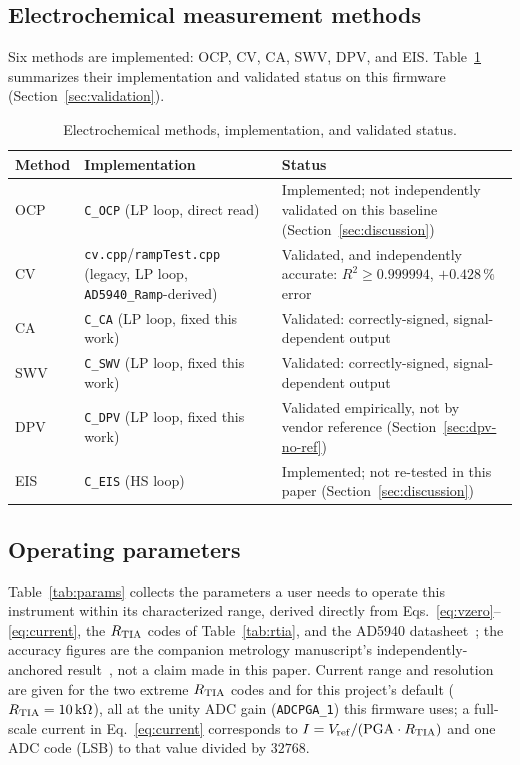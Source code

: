 \subsection{Electrochemical measurement methods}
\label{sec:methodstable}
Six methods are implemented: OCP, CV, CA, SWV, DPV, and EIS.
Table~\ref{tab:methods} summarizes their implementation and validated
status on this firmware (Section~\ref{sec:validation}).

\begin{table}[h]
\centering
\footnotesize
\setlength{\tabcolsep}{4pt}
\caption{Electrochemical methods, implementation, and validated status.}
\label{tab:methods}
\begin{tabular}{@{}p{0.9cm}p{2.6cm}p{3.6cm}@{}}
\toprule
Method & Implementation & Status \\
\midrule
OCP & \texttt{C\_OCP} (LP loop, direct read) & Implemented; not
  independently validated on this baseline (Section~\ref{sec:discussion}) \\
CV & \texttt{cv.cpp}/\texttt{rampTest.cpp} (legacy, LP loop,
  \texttt{AD5940\_Ramp}-derived) & Validated, and independently accurate:
  $R^2\geq0.999994$, $+0.428\,\%$ error~\cite{clement2026linearity} \\
CA & \texttt{C\_CA} (LP loop, fixed this work) & Validated: correctly-signed,
  signal-dependent output~\cite{clement2026architecture} \\
SWV & \texttt{C\_SWV} (LP loop, fixed this work) & Validated: correctly-signed,
  signal-dependent output~\cite{clement2026architecture} \\
DPV & \texttt{C\_DPV} (LP loop, fixed this work) & Validated empirically,
  not by vendor reference (Section~\ref{sec:dpv-no-ref}) \\
EIS & \texttt{C\_EIS} (HS loop) & Implemented; not re-tested in this paper
  (Section~\ref{sec:discussion}) \\
\bottomrule
\end{tabular}
\end{table}

\subsection{Operating parameters}
\label{sec:params}
Table~\ref{tab:params} collects the parameters a user needs to operate
this instrument within its characterized range, derived directly from
Eqs.~\eqref{eq:vzero}--\eqref{eq:current}, the $R_{\mathrm{TIA}}$ codes of
Table~\ref{tab:rtia}, and the AD5940 datasheet~\cite{devices2024ad5940};
the accuracy figures are the companion metrology manuscript's
independently-anchored result~\cite{clement2026linearity}, not a claim
made in this paper. Current range and resolution are given for the two
extreme $R_{\mathrm{TIA}}$ codes and for this project's default
($R_{\mathrm{TIA}}=\SI{10}{\kilo\ohm}$), all at the unity ADC gain
(\texttt{ADCPGA\_1}) this firmware uses; a full-scale current in
Eq.~\eqref{eq:current} corresponds to $I=V_{\mathrm{ref}}/(\mathrm{PGA}\cdot R_{\mathrm{TIA}})$
and one ADC code (LSB) to that value divided by $32768$.

